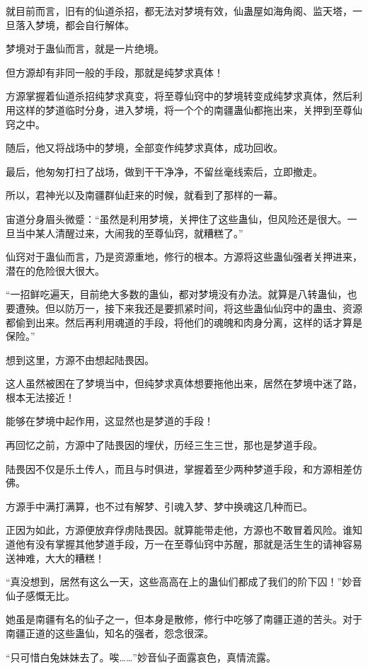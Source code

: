 \begin{this_body}
就目前而言，旧有的仙道杀招，都无法对梦境有效，仙蛊屋如海角阁、监天塔，一旦落入梦境，都会自行解体。

梦境对于蛊仙而言，就是一片绝境。

但方源却有非同一般的手段，那就是纯梦求真体！

方源掌握着仙道杀招纯梦求真变，将至尊仙窍中的梦境转变成纯梦求真体，然后利用这样的梦道临时分身，进入梦境，将一个个的南疆蛊仙都拖出来，关押到至尊仙窍之中。

随后，他又将战场中的梦境，全部变作纯梦求真体，成功回收。

最后，他匆匆打扫了战场，做到干干净净，不留丝毫线索后，立即撤走。

所以，君神光以及南疆群仙赶来的时候，就看到了那样的一幕。

宙道分身眉头微蹙：“虽然是利用梦境，关押住了这些蛊仙，但风险还是很大。一旦当中某人清醒过来，大闹我的至尊仙窍，就糟糕了。”

仙窍对于蛊仙而言，乃是资源重地，修行的根本。方源将这些蛊仙强者关押进来，潜在的危险很大很大。

“一招鲜吃遍天，目前绝大多数的蛊仙，都对梦境没有办法。就算是八转蛊仙，也要遭殃。但以防万一，接下来我还是要抓紧时间，将这些蛊仙仙窍中的蛊虫、资源都偷到出来。然后再利用魂道的手段，将他们的魂魄和肉身分离，这样的话才算是保险。”

想到这里，方源不由想起陆畏因。

这人虽然被困在了梦境当中，但纯梦求真体想要拖他出来，居然在梦境中迷了路，根本无法接近！

能够在梦境中起作用，这显然也是梦道的手段！

再回忆之前，方源中了陆畏因的埋伏，历经三生三世，那也是梦道手段。

陆畏因不仅是乐土传人，而且与时俱进，掌握着至少两种梦道手段，和方源相差仿佛。

方源手中满打满算，也不过有解梦、引魂入梦、梦中换魂这几种而已。

正因为如此，方源便放弃俘虏陆畏因。就算能带走他，方源也不敢冒着风险。谁知道他有没有掌握其他梦道手段，万一在至尊仙窍中苏醒，那就是活生生的请神容易送神难，大大的糟糕！

“真没想到，居然有这么一天，这些高高在上的蛊仙们都成了我们的阶下囚！”妙音仙子感慨无比。

她虽是南疆有名的仙子之一，但本身是散修，修行中吃够了南疆正道的苦头。对于南疆正道的这些蛊仙，知名的强者，怨念很深。

“只可惜白兔妹妹去了。唉……”妙音仙子面露哀色，真情流露。


\end{this_body}
